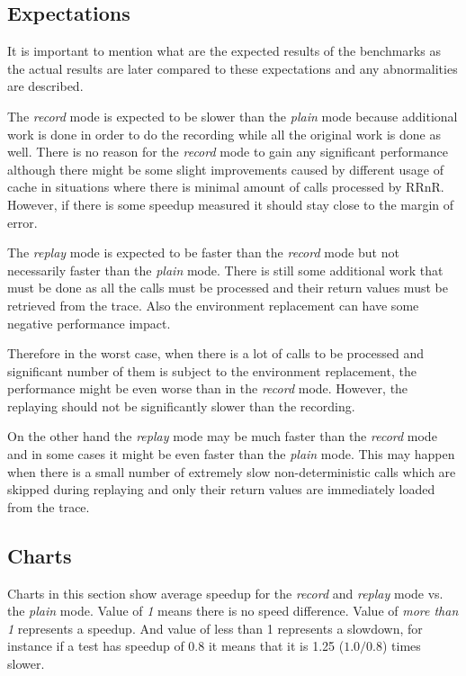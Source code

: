 \documentclass[thesis=M,english,hidelinks]{FITthesis}[2012/10/20]
\begin{document}
		\subsection{Expectations}
		It is important to mention what are the expected results of the benchmarks as the actual results are later compared to these expectations and any abnormalities are described.\par
		
		The \emph{record} mode is expected to be slower than the \emph{plain} mode because additional work is done in order to do the recording while all the original work is done as well. There is no reason for the \emph{record} mode to gain any significant performance although there might be some slight improvements caused by different usage of cache in situations where there is minimal amount of calls processed by RRnR. However, if there is some speedup measured it should stay close to the margin of error.\par
		
		The \emph{replay} mode is expected to be faster than the \emph{record} mode but not necessarily faster than the \emph{plain} mode. There is still some additional work that must be done as all the calls must be processed and their return values must be retrieved from the trace. Also the environment replacement can have some negative performance impact.\par
		
		Therefore in the worst case, when there is a lot of calls to be processed and significant number of them is subject to the environment replacement, the performance might be even worse than in the \emph{record} mode. However, the replaying should not be significantly slower than the recording.\par
		
		On the other hand the \emph{replay} mode may be much faster than the \emph{record} mode and in some cases it might be even faster than the \emph{plain} mode. This may happen when there is a small number of extremely slow non-deterministic calls which are skipped during replaying and only their return values are immediately loaded from the trace.\par
		
		\subsection{Charts}
		Charts in this section show average speedup for the \emph{record} and \emph{replay} mode vs. the \emph{plain} mode. Value of \emph{1} means there is no speed difference. Value of \emph{more than 1} represents a speedup. And value of {less than 1} represents a slowdown, for instance if a test has speedup of 0.8 it means that it is 1.25 ($1.0/0.8$) times slower.\par
		
\end{document}
